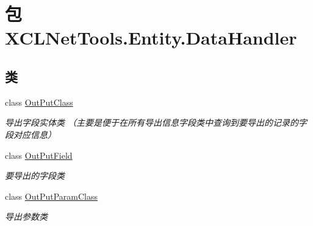 \hypertarget{namespace_x_c_l_net_tools_1_1_entity_1_1_data_handler}{\section{包 X\-C\-L\-Net\-Tools.\-Entity.\-Data\-Handler}
\label{namespace_x_c_l_net_tools_1_1_entity_1_1_data_handler}
}
\subsection*{类}
\begin{DoxyCompactItemize}
\item 
class \hyperlink{class_x_c_l_net_tools_1_1_entity_1_1_data_handler_1_1_out_put_class}{Out\-Put\-Class}
\begin{DoxyCompactList}\small\item\em 导出字段实体类 （主要是便于在所有导出信息字段类中查询到要导出的记录的字段对应信息） \end{DoxyCompactList}\item 
class \hyperlink{class_x_c_l_net_tools_1_1_entity_1_1_data_handler_1_1_out_put_field}{Out\-Put\-Field}
\begin{DoxyCompactList}\small\item\em 要导出的字段类 \end{DoxyCompactList}\item 
class \hyperlink{class_x_c_l_net_tools_1_1_entity_1_1_data_handler_1_1_out_put_param_class}{Out\-Put\-Param\-Class}
\begin{DoxyCompactList}\small\item\em 导出参数类 \end{DoxyCompactList}\end{DoxyCompactItemize}
